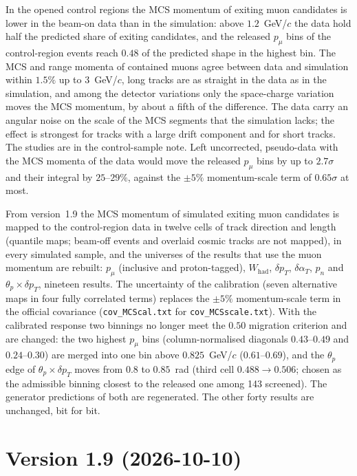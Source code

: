In the opened control regions the MCS momentum of exiting muon candidates is lower in the beam-on data than in the
simulation: above $1.2$~GeV/$c$ the data hold half the predicted share of exiting candidates, and the released
$p_\mu$ bins of the control-region events reach $0.48$ of the predicted shape in the highest bin. The MCS and range
momenta of contained muons agree between data and simulation within $1.5\%$ up to $3$~GeV/$c$, long tracks are as
straight in the data as in the simulation, and among the detector variations only the space-charge variation moves
the MCS momentum, by about a fifth of the difference. The data carry an angular noise on the scale of the MCS segments that
the simulation lacks; the effect is strongest for tracks with a large drift component and for short tracks. The
studies are in the control-sample note. Left uncorrected, pseudo-data with the MCS momenta of the data would move the
released $p_\mu$ bins by up to $2.7\sigma$ and their integral by $25$--$29\%$, against the $\pm5\%$ momentum-scale term
of $0.65\sigma$ at most.

From version~1.9 the MCS momentum of simulated exiting muon candidates is mapped to the control-region data in twelve
cells of track direction and length (quantile maps; beam-off events and overlaid cosmic tracks are not mapped), in
every simulated sample, and the universes of the results that use the muon momentum are rebuilt: $p_\mu$ (inclusive
and proton-tagged), $W_\mathrm{had}$, $\delta p_T$, $\delta\alpha_T$, $p_n$ and $\theta_p\times\delta p_T$, nineteen
results. The uncertainty of the calibration (seven alternative maps in four fully correlated terms) replaces the
$\pm5\%$ momentum-scale term in the official covariance (\texttt{cov\_MCScal.txt} for \texttt{cov\_MCSscale.txt}).
With the calibrated response two binnings no longer meet the $0.50$ migration criterion and are changed: the two highest
$p_\mu$ bins (column-normalised diagonals $0.43$--$0.49$ and $0.24$--$0.30$) are merged into one bin above
$0.825$~GeV/$c$ ($0.61$--$0.69$), and the $\theta_p$ edge of $\theta_p\times\delta p_T$ moves from $0.8$ to $0.85$~rad
(third cell $0.488\to0.506$; chosen as the admissible binning closest to the released one among 143 screened). The
generator predictions of both are regenerated. The other forty results are unchanged, bit for bit.

\section{Version 1.9 (2026-10-10)}

